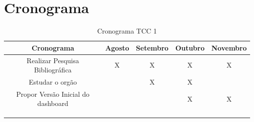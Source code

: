 \section{Cronograma}
\label{cronograma}
\begin{table}[http]
	\centering
	\caption{Cronograma TCC 1}
	\label{tab:cronograma}
	\begin{tabular}{ccccc}
		\hline
		\multicolumn{1}{|c|}{\textbf{Cronograma}}             & \multicolumn{1}{c|}{\textbf{Agosto}} & \multicolumn{1}{c|}{\textbf{Setembro}} & \multicolumn{1}{c|}{\textbf{Outubro}} & \multicolumn{1}{c|}{\textbf{Novembro}} \\ \hline
		\multicolumn{1}{|c|}{Realizar Pesquisa Bibliográfica} & \multicolumn{1}{c|}{X}              & \multicolumn{1}{c|}{X}              & \multicolumn{1}{c|}{X}             & \multicolumn{1}{c|}{X}              \\ \hline
		\multicolumn{1}{|c|}{Estudar o orgão}             & \multicolumn{1}{c|}{}               & \multicolumn{1}{c|}{X}              & \multicolumn{1}{c|}{X}             & \multicolumn{1}{c|}{}               \\ \hline
		\multicolumn{1}{|c|}{Propor Versão Inicial do dashboard}                & \multicolumn{1}{c|}{}               & \multicolumn{1}{c|}{}               & \multicolumn{1}{c|}{X}             & \multicolumn{1}{c|}{X}              \\ \hline
		\multicolumn{1}{l}{}                                  & \multicolumn{1}{l}{}                & \multicolumn{1}{l}{}                & \multicolumn{1}{l}{}               & \multicolumn{1}{l}{}                \\
		\multicolumn{1}{l}{}                                  & \multicolumn{1}{l}{}                & \multicolumn{1}{l}{}                & \multicolumn{1}{l}{}               & \multicolumn{1}{l}{}                \\
		\multicolumn{1}{l}{}                                  & \multicolumn{1}{l}{}                & \multicolumn{1}{l}{}                & \multicolumn{1}{l}{}               & \multicolumn{1}{l}{}               
	\end{tabular}
\end{table}
